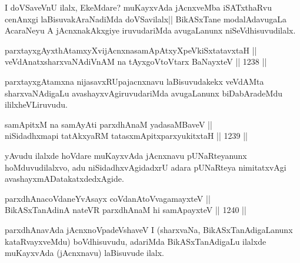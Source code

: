 \begin{artha}
I doVSaveVnU ilalx, EkeMdare? muKayxvAda jAcnxveMba iSATxthaRvu cenAnxgi laBisuvakAraNadiMda doVSavilalx|| BikASxTane modalAdavugaLa AcaraNeyu A jAcnxnakAkxgiye iruvudariMda avugaLanunx niSeVdhisuvudilalx.
\end{artha}


\begin{shl}
parxtayxgAyxthAtamxyXvijAcnxnasamApAtxyX\s peVkiSxtatavxtaH ||  \\
veVdAnatxsharxvaNAdiVnAM na tAyxgoV\s toV\s tarx BaNayxteV \hfill || 1238 ||  
\end{shl}

\begin{artha}
parxtayxgAtamxna nijasavxRUpajacnxnavu laBisuvudakekx veVdAMta sharxvaNAdigaLu avashayxvAgiruvudariMda avugaLanunx biDabAradeMdu ililx\break heVLiruvudu.
\end{artha}


\begin{shl}
samApitxM na samAyAti parxdhAnaM yadasaMBaveV || \\
niSidadhxmapi tatAkxyaRM tatasxmApitxparxyukitxtaH \hfill || 1239 ||  
\end{shl}

\begin{artha}
yAvudu ilalxde hoVdare muKayxvAda jAcnxnavu pUNaRteyanunx hoMduvudilalxvo, adu niSidadhxvAgidadxrU adara pUNaRteya nimitatxvAgi avashayxmADatakatxdedxAgide.
\end{artha}


\begin{shl}
parxdhAnacoVdaneYvAsayx coVdanAtoV\s vagamayxteV || \\
BikASxTanAdinA nateVR parxdhAnaM hi samApayxteV \hfill || 1240 ||  
\end{shl}

\begin{artha}
parxdhAnavAda jAcnxnoVpadeVshaveV I (sharxvaNa, BikASxTanAdigaLanunx kataRvayxveMdu) boVdhisuvudu, adariMda BikASxTanAdigaLu  ilalxde muKayxvAda (jAcnxnavu) laBisuvude ilalx.
\end{artha}


